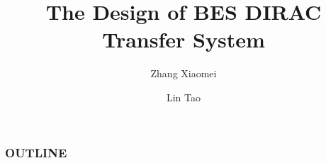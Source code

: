 \documentclass[20pt]{beamer}
\begin{document}
\title{The Design of BES DIRAC Transfer System}
\author{
    Zhang Xiaomei 
    \and
    Lin Tao 
}


\maketitle

\begin{frame}
    \frametitle{OUTLINE}
    \tableofcontents
\end{frame}

\end{document}
